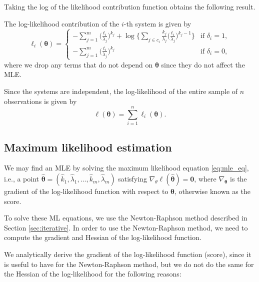 \documentclass[
]{article}
\begin{document}
Taking the log of the likelihood contribution function obtains the
following result.

\begin{corollary}
The log-likelihood contribution of the $i$-th system is given by
\begin{equation}
\ell_i(\boldsymbol{\theta}) =
\begin{cases}
-\sum_{j=1}^{m}\biggl(\frac{t_i}{\lambda_j}\biggr)^{k_j} + \log \biggl\{    
    \sum_{j \in c_i} \frac{k_j}{\lambda_j}\bigl(\frac{t_i}{\lambda_j}\bigr)^{k_j-1}
\biggr\} & \text{if } \delta_i = 1,\\
-\sum_{j=1}^{m}\biggl(\frac{t_i}{\lambda_j}\biggr)^{k_j} & \text{if } \delta_i = 0,
\end{cases}
\end{equation}
where we drop any terms that do not depend on $\boldsymbol{\theta}$ since they do not
affect the MLE.
\end{corollary}

Since the systems are independent, the log-likelihood of the entire
sample of \(n\) observations is given by \begin{equation}
\label{eq:weibull_log_likelihood}
\ell(\boldsymbol{\theta}) = \sum_{i=1}^n \ell_i(\boldsymbol{\theta}).
\end{equation}

\hypertarget{maximum-likelihood-estimation}{%
\subsection{Maximum likelihood
estimation}\label{maximum-likelihood-estimation}}

We may find an MLE by solving the maximum likelihood equation
\eqref{eq:mle_eq}, i.e., a point
\(\boldsymbol{\hat\theta} = (\hat{k}_1,\hat{\lambda}_1,\ldots,\hat{k}_m,\hat{\lambda}_m)\)
satisfying
\(\nabla_{\theta} \ell(\boldsymbol{\hat\theta}) = \boldsymbol{0}\),
where \(\nabla_{\boldsymbol{\theta}}\) is the gradient of the
log-likelihood function with respect to \(\boldsymbol{\theta}\),
otherwise known as the score.

To solve these ML equations, we use the Newton-Raphson method described
in Section \ref{sec:iterative}. In order to use the Newton-Raphson
method, we need to compute the gradient and Hessian of the
log-likelihood function.

We analytically derive the gradient of the log-likelihood function
(score), since it is useful to have for the Newton-Raphson method, but
we do not do the same for the Hessian of the log-likelihood for the
following reasons:
\end{document}
